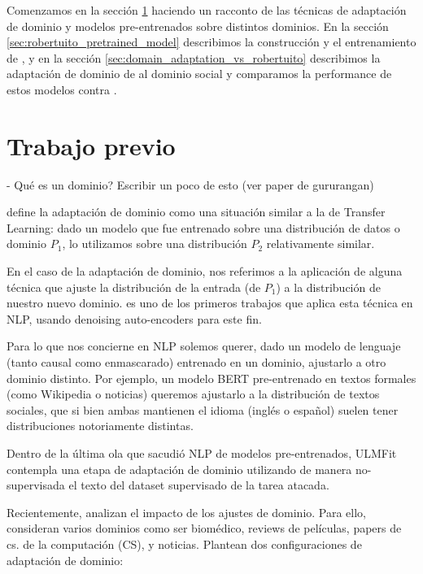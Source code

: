 Comenzamos en la sección \ref{sec:domain_adaptation_previous_work} haciendo un racconto de las técnicas de adaptación de dominio y modelos pre-entrenados sobre distintos dominios. En la sección \ref{sec:robertuito_pretrained_model} describimos la construcción y el entrenamiento de \robertuito{}, y en la sección \ref{sec:domain_adaptation_vs_robertuito} describimos la adaptación de dominio de \beto{} al dominio social y comparamos la performance de estos modelos contra \robertuito{}.

\section{Trabajo previo}
\label{sec:domain_adaptation_previous_work}

- Qué es un dominio? Escribir un poco de esto (ver paper de gururangan)

\citet{goodfellow2016deep} define la adaptación de dominio como una situación similar a la de Transfer Learning: dado un modelo que fue entrenado sobre una distribución de datos o dominio $P_1$, lo utilizamos sobre una distribución $P_2$ relativamente similar.

En el caso de la adaptación de dominio, nos referimos a la aplicación de alguna técnica que ajuste la distribución de la entrada (de $P_1$) a la distribución de nuestro nuevo dominio. \citet{glorot2011domain} es uno de los primeros trabajos que aplica esta técnica en NLP, usando denoising auto-encoders para este fin. 

Para lo que nos concierne en NLP solemos querer, dado un modelo de lenguaje (tanto causal como enmascarado) entrenado en un dominio, ajustarlo a otro dominio distinto. Por ejemplo, un modelo BERT pre-entrenado en textos formales (como Wikipedia o noticias) queremos ajustarlo a la distribución de textos sociales, que si bien ambas mantienen el idioma (inglés o español) suelen tener distribuciones notoriamente distintas.

Dentro de la última ola que sacudió NLP de modelos pre-entrenados, ULMFit \citet{howard-ruder-2018-universal} contempla una etapa de adaptación de dominio utilizando de manera no-supervisada el texto del dataset supervisado de la tarea atacada.

Recientemente, \citet{gururangan-etal-2020-dont} analizan el impacto de los ajustes de dominio. Para ello, consideran varios dominios como ser biomédico, reviews de películas, papers de cs. de la computación (CS), y noticias. Plantean dos configuraciones de adaptación de dominio:

